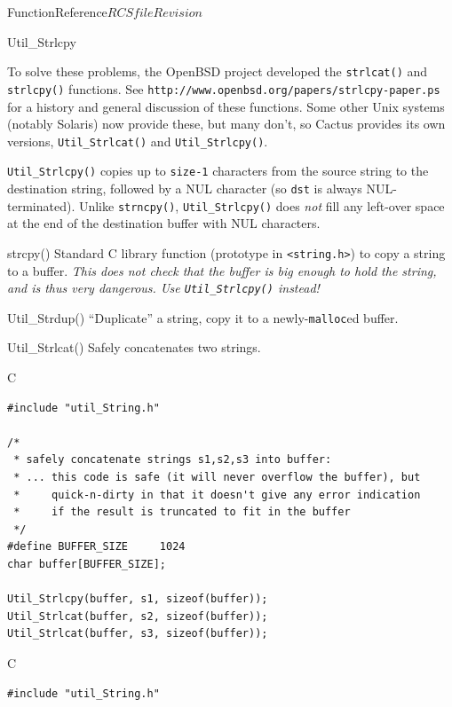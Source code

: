 \begin{cactuspart}{FunctionReference}{$RCSfile$}{$Revision$}
\begin{FunctionDescription}{Util\_Strlcpy}
\begin{Discussion}
To solve these problems, the OpenBSD project developed the
\verb|strlcat()| and \verb|strlcpy()| functions.  See
\verb|http://www.openbsd.org/papers/strlcpy-paper.ps|
for a history and general discussion of these functions.
Some other Unix systems (notably Solaris) now provide these,
but many don't, so Cactus provides its own versions,
\verb|Util_Strlcat()| and \verb|Util_Strlcpy()|.

\verb|Util_Strlcpy()| copies up to \verb|size-1| characters from the
source string to the destination string, followed by a NUL character
(so \verb|dst| is always NUL-terminated).  Unlike \verb|strncpy()|,
\verb|Util_Strlcpy()| does {\em not\/} fill any left-over space at
the end of the destination buffer with NUL characters.
\end{Discussion}

\begin{SeeAlsoSection}
\begin{SeeAlso}{strcpy()}
Standard C library function (prototype in \verb|<string.h>|)
to copy a string to a buffer.
{\em This does not check that the buffer is big enough to hold the string,
and is thus very dangerous.  Use \verb|Util_Strlcpy()| instead!}
\end{SeeAlso}
\begin{SeeAlso}{Util\_Strdup()}
``Duplicate'' a string, \ie{} copy it to a newly-\verb|malloc|ed buffer.
\end{SeeAlso}
\begin{SeeAlso}{Util\_Strlcat()}
Safely concatenates two strings.
\end{SeeAlso}
\end{SeeAlsoSection}

\begin{ExampleSection}
\begin{Example}{C}
\begin{verbatim}
#include "util_String.h"

/*
 * safely concatenate strings s1,s2,s3 into buffer:
 * ... this code is safe (it will never overflow the buffer), but
 *     quick-n-dirty in that it doesn't give any error indication
 *     if the result is truncated to fit in the buffer
 */
#define BUFFER_SIZE     1024
char buffer[BUFFER_SIZE];

Util_Strlcpy(buffer, s1, sizeof(buffer));
Util_Strlcat(buffer, s2, sizeof(buffer));
Util_Strlcat(buffer, s3, sizeof(buffer));
\end{verbatim}
\end{Example}
\begin{Example}{C}
\begin{verbatim}
#include "util_String.h"


\end{verbatim}
\end{Example}
\end{ExampleSection}
\end{FunctionDescription}
\end{cactuspart}
